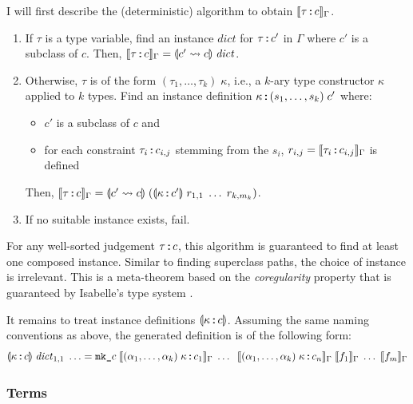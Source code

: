 I will first describe the (deterministic) algorithm to obtain $\llbracket\tau \mathbin{:\!\!:} c\rrbracket_\Gamma$.
\begin{enumerate}
  \item
    If $\tau$ is a type variable, find an instance $\mathit{dict}$ for $\tau \mathbin{:\!\!:} c'$  in $\Gamma$ where $c'$ is a subclass of $c$.
    Then, $\llbracket\tau \mathbin{:\!\!:} c\rrbracket_\Gamma = \llparenthesis c' \leadsto c\rrparenthesis\;\mathit{dict}$.
  \item
    Otherwise, $\tau$ is of the form $(\tau_1, \ldots, \tau_k)\;\kappa$, i.e., a $k$-ary type constructor $\kappa$ applied to $k$ types.
    Find an instance definition $\kappa \mathbin{:\!\!:} (s_1, \ldots, s_k)\;c'$ where:
    \begin{itemize}
      \item $c'$ is a subclass of $c$ and
      \item for each constraint $\tau_i \mathbin{:\!\!:} c_{i,j}$ stemming from the $s_i$, $r_{i,j} = \llbracket\tau_i \mathbin{:\!\!:} c_{i,j}\rrbracket_\Gamma$ is defined
    \end{itemize}
    Then, $\llbracket\tau \mathbin{:\!\!:} c\rrbracket_\Gamma = \llparenthesis c' \leadsto c\rrparenthesis\;(\llparenthesis\kappa \mathbin{:\!\!:} c'\rrparenthesis\;r_{1,1}\;\ldots\;r_{k,m_k})$.
  \item
    If no suitable instance exists, fail.
\end{enumerate}

\noindent For any well-sorted judgement $\tau \mathbin{:\!\!:} c$, this algorithm is guaranteed to find at least one composed instance.
Similar to finding superclass paths, the choice of instance is irrelevant.
This is a meta-theorem based on the \emph{coregularity} property that is guaranteed by Isabelle's type system \cite{nipkow1991typeclasses,nipkow1995reconstruction}.

It remains to treat instance definitions $\llparenthesis\kappa \mathbin{:\!\!:} c\rrparenthesis$.
Assuming the same naming conventions as above, the generated definition is of the following form:
\[
  \llparenthesis\kappa \mathbin{:\!\!:} c\rrparenthesis\;\mathit{dict}_{1,1}\;\ldots = \texttt{\textup{mk\_}}c\;\llbracket(\alpha_1, \ldots, \alpha_k)\;\kappa \mathbin{:\!\!:} c_1\rrbracket_\Gamma\;\ldots\;\;\llbracket(\alpha_1, \ldots, \alpha_k)\;\kappa \mathbin{:\!\!:} c_n\rrbracket_\Gamma\;\llbracket f_1\rrbracket_\Gamma\;\ldots\;\llbracket f_m\rrbracket_\Gamma
\]

\subsubsection{Terms}

